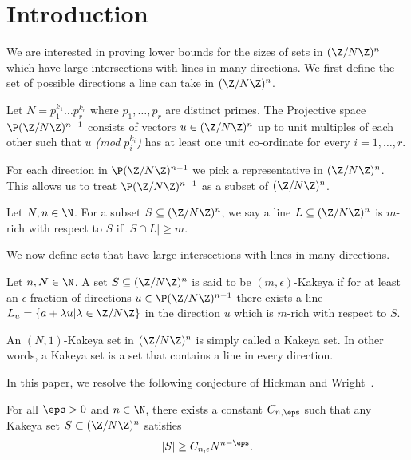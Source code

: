 \section{Introduction}
We are interested in proving lower bounds for the sizes of sets in $(\Z/N\Z)^n$ which have large intersections with lines in many directions. We first define the set of possible directions a line can take in $(\Z/N\Z)^n$.

\begin{define}
Let $N=p_1^{k_1}\hdots p_r^{k_r}$ where $p_1,\hdots,p_r$ are distinct primes. The Projective space $\P (\Z/N\Z)^{n-1}$ consists of vectors $u\in (\Z/N\Z)^n$ up to unit multiples of each other such that {\em $u$ (mod $p_i^{k_i}$)} has at least one unit co-ordinate for every $i=1,\hdots,r$.
\end{define}

For each direction in $\P (\Z/N\Z)^{n-1}$ we pick a representative in $(\Z/N\Z)^n$. This allows us to treat $\P (\Z/N\Z)^{n-1}$ as a subset of $(\Z/N\Z)^n$. 



\begin{define}
Let $N,n\in \N$. For a subset $S\subseteq (\Z/N\Z)^n$, we say a line $L\subseteq (\Z/N\Z)^n$ is $m$-rich with respect to $S$ if $|S\cap L|\ge m$.
\end{define}

We now define sets that have large intersections with lines in many directions.

\begin{define}
Let $n,N\in \N$. A set $S\subseteq (\Z/N\Z)^n$ is said to be $(m,\epsilon)$-Kakeya if for at least an $\epsilon$ fraction of directions $u\in \P (\Z/N\Z)^{n-1}$ there exists a line $L_u=\{a+\lambda u| \lambda \in \Z/N\Z\}$ in the direction $u$ which is $m$-rich with respect to $S$.

An $(N,1)$-Kakeya set in $(\Z/N\Z)^n$ is simply called a Kakeya set. In other words, a Kakeya set is a set that contains a line in every direction. 
\end{define}

In this paper, we resolve the following conjecture of Hickman and Wright~\cite{hickman2018fourier}.

\begin{conjecture}\label{conj}
For all $\eps > 0$ and $n\in \N$, there exists a constant $C_{n,\eps}$ such that any Kakeya set $S \subset (\Z/N\Z)^n$ satisfies 
$$ |S| \geq C_{n,\epsilon} N^{n-\eps}.$$
\end{conjecture}

